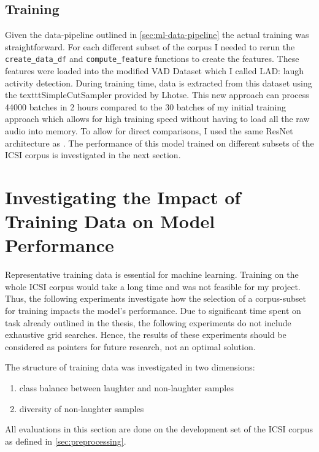 \documentclass[bsc,frontabs,parskip,deptreport]{infthesis}
\begin{document}
\section{Training}
Given the data-pipeline outlined in \autoref{sec:ml-data-pipeline} the actual training was straightforward. For each different subset of the corpus I needed to rerun the \verb|create_data_df| and \verb|compute_feature| functions to create the features. 
These features were loaded into the modified VAD Dataset which I called LAD: laugh activity detection.
During training time, data is extracted from this dataset using the texttt{SimpleCutSampler} provided by Lhotse. 
This new approach can process 44000 batches in 2 hours compared to the 30 batches of my initial training approach which allows for high training speed without having to load all the raw audio into memory.
To allow for direct comparisons, I used the same ResNet architecture as \citet{gillick2021robust}.
The performance of this model trained on different subsets of the ICSI corpus is investigated in the next section.

\chapter{Investigating the Impact of Training Data on Model Performance} \label{cha:experiments}
Representative training data is essential for machine learning. Training on the whole ICSI corpus would take a long time and was not feasible for my project.
Thus, the following experiments investigate how the selection of a corpus-subset for training impacts the model's performance. 
Due to significant time spent on task already outlined in the thesis, the following experiments do not include exhaustive grid searches. Hence, the results of these experiments should be considered as pointers for future research, not an optimal solution.

The structure of training data was investigated in two dimensions: 
\begin{enumerate}
    \item class balance between laughter and non-laughter samples
    \item diversity of non-laughter samples 
\end{enumerate}

All evaluations in this section are done on the development set of the ICSI corpus as defined in \autoref{sec:preprocessing}.
\end{document}
